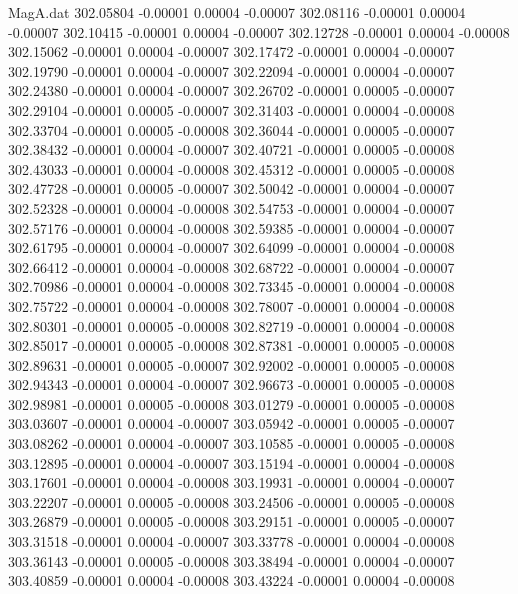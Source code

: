 \begin{filecontents}{MagA.dat}
 302.05804   -0.00001    0.00004   -0.00007
 302.08116   -0.00001    0.00004   -0.00007
 302.10415   -0.00001    0.00004   -0.00007
 302.12728   -0.00001    0.00004   -0.00008
 302.15062   -0.00001    0.00004   -0.00007
 302.17472   -0.00001    0.00004   -0.00007
 302.19790   -0.00001    0.00004   -0.00007
 302.22094   -0.00001    0.00004   -0.00007
 302.24380   -0.00001    0.00004   -0.00007
 302.26702   -0.00001    0.00005   -0.00007
 302.29104   -0.00001    0.00005   -0.00007
 302.31403   -0.00001    0.00004   -0.00008
 302.33704   -0.00001    0.00005   -0.00008
 302.36044   -0.00001    0.00005   -0.00007
 302.38432   -0.00001    0.00004   -0.00007
 302.40721   -0.00001    0.00005   -0.00008
 302.43033   -0.00001    0.00004   -0.00008
 302.45312   -0.00001    0.00005   -0.00008
 302.47728   -0.00001    0.00005   -0.00007
 302.50042   -0.00001    0.00004   -0.00007
 302.52328   -0.00001    0.00004   -0.00008
 302.54753   -0.00001    0.00004   -0.00007
 302.57176   -0.00001    0.00004   -0.00008
 302.59385   -0.00001    0.00004   -0.00007
 302.61795   -0.00001    0.00004   -0.00007
 302.64099   -0.00001    0.00004   -0.00008
 302.66412   -0.00001    0.00004   -0.00008
 302.68722   -0.00001    0.00004   -0.00007
 302.70986   -0.00001    0.00004   -0.00008
 302.73345   -0.00001    0.00004   -0.00008
 302.75722   -0.00001    0.00004   -0.00008
 302.78007   -0.00001    0.00004   -0.00008
 302.80301   -0.00001    0.00005   -0.00008
 302.82719   -0.00001    0.00004   -0.00008
 302.85017   -0.00001    0.00005   -0.00008
 302.87381   -0.00001    0.00005   -0.00008
 302.89631   -0.00001    0.00005   -0.00007
 302.92002   -0.00001    0.00005   -0.00008
 302.94343   -0.00001    0.00004   -0.00007
 302.96673   -0.00001    0.00005   -0.00008
 302.98981   -0.00001    0.00005   -0.00008
 303.01279   -0.00001    0.00005   -0.00008
 303.03607   -0.00001    0.00004   -0.00007
 303.05942   -0.00001    0.00005   -0.00007
 303.08262   -0.00001    0.00004   -0.00007
 303.10585   -0.00001    0.00005   -0.00008
 303.12895   -0.00001    0.00004   -0.00007
 303.15194   -0.00001    0.00004   -0.00008
 303.17601   -0.00001    0.00004   -0.00008
 303.19931   -0.00001    0.00004   -0.00007
 303.22207   -0.00001    0.00005   -0.00008
 303.24506   -0.00001    0.00005   -0.00008
 303.26879   -0.00001    0.00005   -0.00008
 303.29151   -0.00001    0.00005   -0.00007
 303.31518   -0.00001    0.00004   -0.00007
 303.33778   -0.00001    0.00004   -0.00008
 303.36143   -0.00001    0.00005   -0.00008
 303.38494   -0.00001    0.00004   -0.00007
 303.40859   -0.00001    0.00004   -0.00008
 303.43224   -0.00001    0.00004   -0.00008

\end{filecontents}
